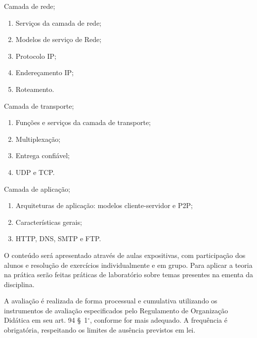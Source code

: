 \begin{pud}
\begin{description}[itemsep=0em]
         \item[UNIDADE IV:] Camada de  rede;
	         \begin{enumerate}[itemsep=0em, topsep=0em]
                \item Serviços da camada de rede;
                \item Modelos de serviço de Rede;
                \item Protocolo IP;
                \item Endereçamento IP;
                \item Roteamento.
            \end{enumerate}

         \item[UNIDADE V:] Camada de  transporte;
	         \begin{enumerate}[itemsep=0em, topsep=0em]
                \item Funções e serviços da camada de transporte;
                \item Multiplexação;
                \item Entrega confiável;
                \item UDP e TCP.
            \end{enumerate}
            
         \item[UNIDADE VI:] Camada de  aplicação;
	         \begin{enumerate}[itemsep=0em, topsep=0em]
            	\item Arquiteturas de aplicação: modelos cliente-servidor e P2P;
            	\item Características gerais;
            	\item HTTP, DNS, SMTP e FTP.
            \end{enumerate}
                                    
	\end{description}	
	
	\metodologia
	O conteúdo será apresentado através de aulas expositivas, com participação dos alunos e resolução de exercícios individualmente e em grupo. Para aplicar a teoria na prática serão feitas práticas de laboratório sobre temas presentes na ementa da disciplina.


	\avaliacao
	A avaliação é realizada de forma processual e cumulativa utilizando os instrumentos de avaliação especificados pelo Regulamento de Organização Didática em seu art. 94 \S~1$^\circ$, conforme for mais adequado. A frequência é obrigatória, respeitando os limites de ausência previstos em lei.
	

\end{pud}
